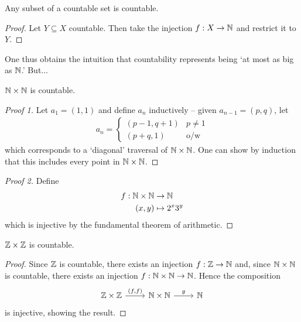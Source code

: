\documentclass{../template/note}
\begin{document}
    \begin{corollary}
        Any subset of a countable set is countable.
    \end{corollary}
    
    \begin{proof}
        Let \(Y \subseteq X\) countable. Then take the injection \(f: X \to \mathbb N\) and restrict it to \(Y\).
    \end{proof}

    One thus obtains the intuition that countability represents being `at most as big as \(\mathbb N\).' But...

    \begin{theorem}
        \(\mathbb N \times \mathbb N\) is countable.
    \end{theorem}
    
    \begin{proof}[Proof 1]
        Let \(a_1 = (1, 1)\) and define \(a_n\) inductively -- given \(a_{n-1} = (p, q)\), let
        \begin{align*}
            a_n = \begin{cases}
                (p-1, q+1) & p \neq 1 \\
                (p+q, 1) & \text{o/w}
            \end{cases}
        \end{align*}
        which corresponds to a `diagonal' traversal of \(\mathbb N \times \mathbb N\). One can show by induction that this includes every point in \(\mathbb N \times \mathbb N\).
    \end{proof}
    
    \begin{proof}[Proof 2]
        Define
        \begin{align*}
            f: \mathbb N \times \mathbb N &\to \mathbb N \\
            (x, y) &\mapsto 2^x3^y
        \end{align*}
        which is injective by the fundamental theorem of arithmetic.        
    \end{proof}
    
    \begin{corollary}
        \(\mathbb Z \times \mathbb Z\) is countable.
    \end{corollary}
    
    \begin{proof}
        Since \(\mathbb Z\) is countable, there exists an injection \(f: \mathbb Z \to \mathbb N\) and, since \(\mathbb N \times \mathbb N\) is countable, there exists an injection \(f: \mathbb N \times \mathbb N \to \mathbb N\). Hence the composition
        \[\begin{tikzcd}[ampersand replacement=\&]
            {\ZZ \times \ZZ} \& {\NN \times \NN} \& \NN
            \arrow["{(f, f)}", from=1-1, to=1-2]
            \arrow["g", from=1-2, to=1-3]
        \end{tikzcd}\]
        is injective, showing the result.
    \end{proof}
\end{document}
